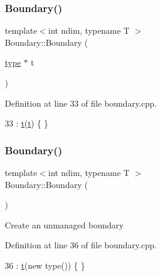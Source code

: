 \subsubsection{\texorpdfstring{Boundary()}{Boundary()}\hspace{0.1cm}{\footnotesize\ttfamily [1/3]}}
{\footnotesize\ttfamily template$<$int ndim, typename T $>$ \\
Boundary\+::\+Boundary (\begin{DoxyParamCaption}\item[{\hyperlink{classshark_1_1ndim_1_1_boundary_1_1type}{type} $\ast$}]{t }\end{DoxyParamCaption})\hspace{0.3cm}{\ttfamily [private]}}



Definition at line 33 of file boundary.\+cpp.


\begin{DoxyCode}
33 : \hyperlink{classshark_1_1ndim_1_1_boundary_a16fdfa33d88480b4127ff36c1f1a2ce7}{t}(\hyperlink{classshark_1_1ndim_1_1_boundary_a16fdfa33d88480b4127ff36c1f1a2ce7}{t}) \{ \}
\end{DoxyCode}
\hypertarget{classshark_1_1ndim_1_1_boundary_a7c4c8db45b13dab630e4c6ed7a958e71}{}\label{classshark_1_1ndim_1_1_boundary_a7c4c8db45b13dab630e4c6ed7a958e71} 
\subsubsection{\texorpdfstring{Boundary()}{Boundary()}\hspace{0.1cm}{\footnotesize\ttfamily [2/3]}}
{\footnotesize\ttfamily template$<$int ndim, typename T $>$ \\
Boundary\+::\+Boundary (\begin{DoxyParamCaption}{ }\end{DoxyParamCaption})}

Create an unmanaged boundary 

Definition at line 36 of file boundary.\+cpp.


\begin{DoxyCode}
36 : \hyperlink{classshark_1_1ndim_1_1_boundary_a16fdfa33d88480b4127ff36c1f1a2ce7}{t}(\textcolor{keyword}{new} type()) \{ \}
\end{DoxyCode}
\hypertarget{classshark_1_1ndim_1_1_boundary_a86eab4f2362618c5b1e3d0df3a5f7f42}{}\label{classshark_1_1ndim_1_1_boundary_a86eab4f2362618c5b1e3d0df3a5f7f42} 

